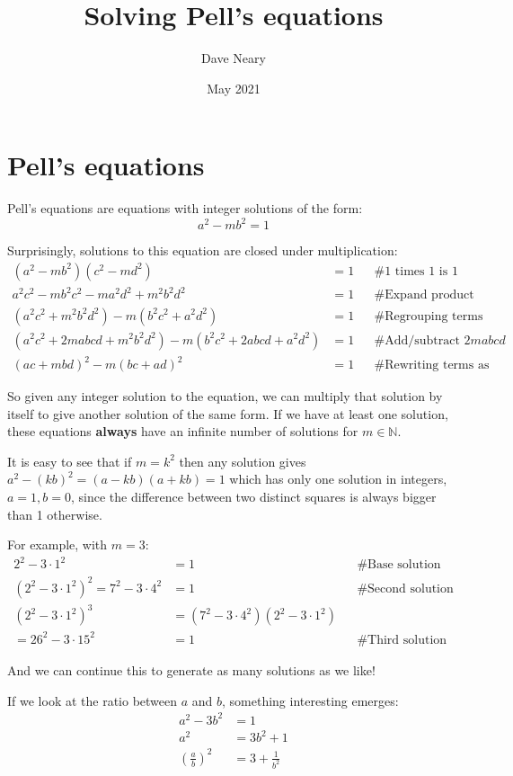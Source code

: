\documentclass{article}
\title{Solving Pell's equations}
\author{Dave Neary}
\date{May 2021}
\begin{document}
\maketitle

\section{Pell's equations}

Pell's equations are equations with integer solutions of the form:
\[ a^2-mb^2 = 1 \]

Surprisingly, solutions to this equation are closed under multiplication:
\begin{align*}
(a^2 - mb^2)(c^2 - md^2) &= 1 && \text{\# 1 times 1 is 1}\\
a^2c^2 - mb^2c^2 -ma^2d^2 + m^2b^2d^2 &= 1 && \text{\# Expand product} \\
(a^2c^2 + m^2b^2d^2) - m(b^2c^2 + a^2d^2)  &= 1 && \text{\# Regrouping terms} \\
(a^2c^2 + 2mabcd + m^2b^2d^2) - m(b^2c^2  + 2abcd + a^2d^2)  &= 1 && \text{\# Add/subtract } 2mabcd \\
(ac + mbd)^2 - m(bc + ad)^2  &= 1 && \text{\# Rewriting terms as squares}
\end{align*}

So given any integer solution to the equation, we can multiply that solution by itself to give
another solution of the same form. If we have at least one solution, these equations
\textbf{always} have an infinite number of solutions for $m \in \mathbb{N}$.

It is easy to see that if $m = k^2$ then any solution gives $a^2 - (kb)^2 = (a-kb)(a+kb) = 1$
which has only one solution in integers, $a=1, b=0$, since the difference between two distinct
squares is always bigger than 1 otherwise.

For example, with $m=3$:
\begin{align*}
    2^2 - 3\cdot 1^2 &= 1 && \text{\# Base solution} \\
    (2^2 - 3\cdot 1^2)^2 = 7^2 - 3\cdot 4^2 &= 1 &&  \text{\# Second solution} \\
    (2^2 - 3\cdot 1^2)^3 &= (7^2 - 3\cdot 4^2)(2^2 - 3\cdot 1^2) && \\
    = 26^2 - 3 \cdot 15^2 &= 1 && \text{\# Third solution}
\end{align*}

And we can continue this to generate as many solutions as we like!

If we look at the ratio between $a$ and $b$, something interesting emerges:
\begin{align*}
    a^2 - 3b^2 &= 1 \\
    a^2 &= 3b^2 + 1 \\
    \left(\frac{a}{b}\right)^2 &= 3 + \frac{1}{b^2}
\end{align*}
\end{document}
